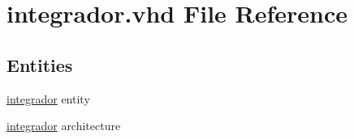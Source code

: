 \hypertarget{integrador_8vhd}{}\section{integrador.\+vhd File Reference}
\label{integrador_8vhd}
\subsection*{Entities}
\begin{DoxyCompactItemize}
\item 
\hyperlink{classintegrador}{integrador} entity
\item 
\hyperlink{classintegrador_1_1integrador}{integrador} architecture
\end{DoxyCompactItemize}
